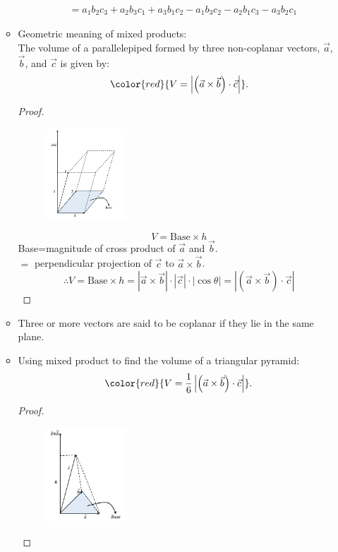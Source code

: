 \documentclass[12pt, a4paper]{article}
\newtheorem{proof}{Proof}[subsection]
\begin{document}
\begin{enumerate}
\begin{itemize}
$$\begin{aligned}
      &=a_1b_2c_3+a_2b_3c_1+a_3b_1c_2-a_1b_3c_2-a_2b_1c_3-a_3b_2c_1
    \end{aligned}$$
    \item Geometric meaning of mixed products: \\
    The volume of a parallelepiped formed by three non-coplanar vectors, $\vec{a}$, $\vec{b}$, and $\vec{c}$ is given by: 
    $${\color{red}{V=\left|\left(\vec{a}\times\vec{b}\right)\cdot\vec{c}\right|}}.$$
    \begin{proof}
      \begin{figure}[H]
        \centering
        \includegraphics[width=0.3\textwidth]{Fig.3.10.jpg}
      \end{figure}
      $$V=\text{Base}\times h$$
      Base=magnitude of cross product of $\vec{a}$ and $\vec{b}$.\\
      $=$ perpendicular projection of $\vec{c}$ to $\vec{a}\times\vec{b}$.\\
      $$\therefore V=\text{Base}\times h=\left|\vec{a}\times\vec{b}\right|\cdot\left|\vec{c}\right|\cdot\left|\cos\theta\right|=\left|\left(\vec{a}\times\vec{b}\right)\cdot\vec{c}\right|$$
    \end{proof}
    \item Three or more vectors are said to be coplanar if they lie in the same plane.
    \item Using mixed product to find the volume of a triangular pyramid: 
    $${\color{red}{V=\frac{1}{6}\left|\left(\vec{a}\times\vec{b}\right)\cdot\vec{c}\right|}}.$$
    \begin{proof}
      \begin{figure}[H]
        \centering
        \includegraphics[width=0.3\textwidth]{Fig.3.11.jpg}

\end{figure}
\end{proof}
\end{itemize}
\end{enumerate}
\end{document}
